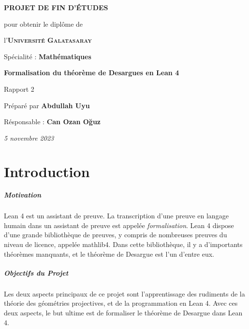 \documentclass[12pt, oneside]{memoir}
\theoremstyle{definition}
\theoremstyle{remark}
\begin{document}
\thispagestyle{empty}
\begin{center}
  \vspace*{\fill}
  

  \vspace{1cm}
  \large{\textbf{PROJET DE FIN D'ÉTUDES}}

  \vspace{0.5cm}
  {\small pour obtenir le diplôme de}

  \vspace{0.5cm}
  l'\textsc{\textbf{Université Galatasaray}}

  {\small Spécialité : \textbf{Mathématiques}}

  \vspace{2.25cm}
  {\Large\textbf{Formalisation du théorème de Desargues en Lean 4}}

  Rapport 2

  \vspace{1.25cm}
  Préparé par \textbf{Abdullah Uyu}

  Résponsable : \textbf{Can Ozan Oğuz}

  \vspace{2.25cm}
  \textit{5 novembre 2023}
  \vspace*{\fill}
\end{center}
\clearpage
\tableofcontents
\raggedright
{}
\chapter{Introduction}
\paragraph{Motivation}
Lean 4 est un assistant de preuve. La transcription d'une preuve en
langage humain dans un assistant de preuve est appelée
\textit{formalisation}. Lean 4 dispose d'une grande bibliothèque de
preuves, y compris de nombreuses preuves du niveau de licence, appelée
mathlib4. Dans cette bibliothèque, il y a d'importants théorèmes
manquants, et le théorème de Desargue est l'un d'entre eux.
\paragraph{Objectifs du Projet}
Les deux aspects principaux de ce projet sont l'apprentissage des
rudiments de la théorie des géométries projectives, et de la
programmation en Lean 4. Avec ces deux aspects, le but ultime est de
formaliser le théorème de Desargue dans Lean 4.
\end{document}
